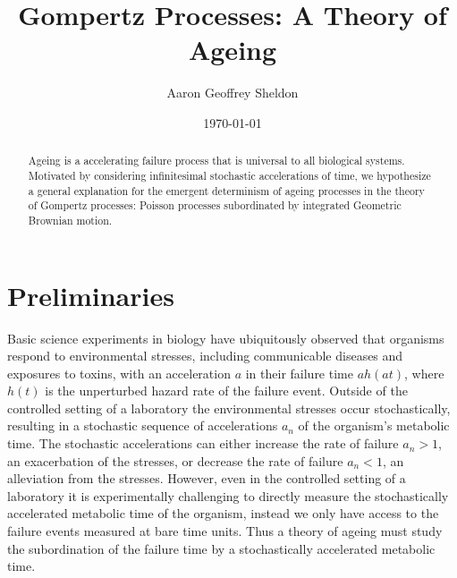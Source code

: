 \documentclass{article}
\theoremstyle{definition}\newtheorem{definition}{Definition}
\begin{document}
  \title{Gompertz Processes: A Theory of Ageing}
  \author{Aaron Geoffrey Sheldon}
  \date{\today}
  \maketitle

  \begin{abstract}
    Ageing is a accelerating failure process that is universal to all biological systems.
    Motivated by considering infinitesimal stochastic accelerations of time, we hypothesize
    a general explanation for the emergent determinism of ageing processes in the theory of
    Gompertz processes: Poisson processes subordinated by integrated Geometric Brownian
    motion.
  \end{abstract}

  \section{Preliminaries}
  Basic science experiments in biology have ubiquitously observed that organisms respond to
  environmental stresses, including communicable diseases and exposures to toxins, with an
  acceleration $a$ in their failure time $a h\left(a t\right)$, where $h\left(t\right)$ is
  the unperturbed hazard rate of the failure event. Outside of the controlled setting of a
  laboratory the environmental stresses occur stochastically, resulting in a stochastic
  sequence of accelerations $a_n$ of the organism's metabolic time. The stochastic
  accelerations can either increase the rate of failure $a_n > 1$, an exacerbation of the
  stresses, or decrease the rate of failure $a_n < 1$, an alleviation from the stresses.
  However, even in the controlled setting of a laboratory it is experimentally challenging
  to directly measure the stochastically accelerated metabolic time of the organism, instead
  we only have access to the failure events measured at bare time units. Thus a theory of
  ageing must study the subordination of the failure time by a stochastically accelerated
  metabolic time.
\end{document}
